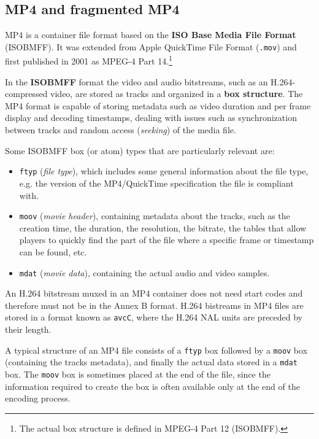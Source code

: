 \subsection{MP4 and fragmented MP4}
\label{sec:bg/containers/mp4}

MP4 is a container file format based on the \textbf{ISO Base Media File Format} (ISOBMFF). It was extended from Apple QuickTime File Format (\texttt{.mov}) and first published in 2001 as MPEG-4 Part 14.\footnote{The actual box structure is defined in MPEG-4 Part 12 (ISOBMFF).}\cite{mpeg4part12}

In the \textbf{ISOBMFF} format the video and audio bitstreams, such as an H.264-compressed video, are stored as tracks and organized in a \textbf{box structure}. The MP4 format is capable of storing metadata such as video duration and per frame display and decoding timestamps, dealing with issues such as synchronization between tracks and random access (\textit{seeking}) of the media file.


Some ISOBMFF box (or atom) types that are particularly relevant are:

\begin{itemize}
    \item \texttt{ftyp} (\textit{file type}), which includes some general information about the file type, e.g. the version of the MP4/QuickTime specification the file is compliant with.
    \item \texttt{moov} (\textit{movie header}), containing metadata about the tracks, such as the creation time, the duration, the resolution, the bitrate, the tables that allow players to quickly find the part of the file where a specific frame or timestamp can be found, etc.
    \item \texttt{mdat} (\textit{movie data}), containing the actual audio and video samples.
\end{itemize}

An H.264 bitstream muxed in an MP4 container does not need start codes and therefore must not be in the Annex B format. H.264 bistreams in MP4 files are stored in a format known as \texttt{avcC}, where the H.264 NAL units are preceded by their length.

A typical structure of an MP4 file consists of a \texttt{ftyp} box followed by a \texttt{moov} box (containing the tracks metadata), and finally the actual data stored in a \texttt{mdat} box. The \texttt{moov} box is sometimes placed at the end of the file, since the information required to create the box is often available only at the end of the encoding process.

